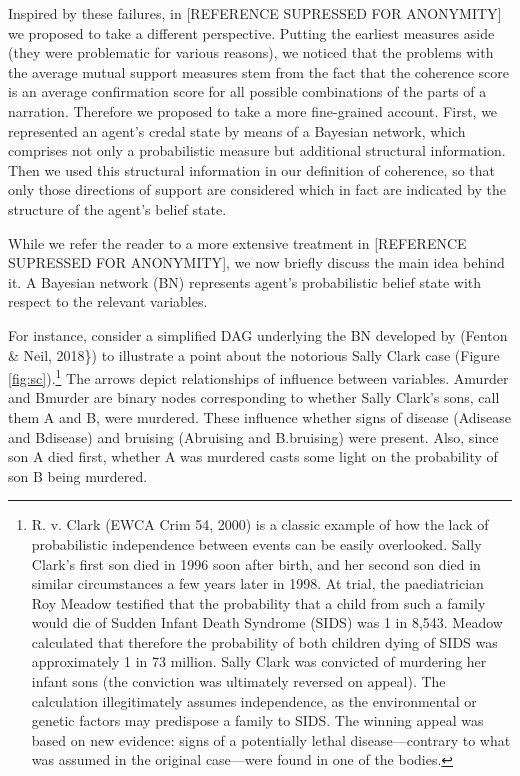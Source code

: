 \documentclass[
  10pt,
]{scrartcl}
\begin{document}
Inspired by these failures, in {[}REFERENCE SUPRESSED FOR ANONYMITY{]} we proposed to take a different perspective. Putting the earliest measures aside (they were problematic for various reasons), we noticed that the problems with the average mutual support measures stem from the fact that the coherence score is an average confirmation score for all possible combinations of the parts of a narration. Therefore we proposed to take a more fine-grained account. First, we represented an agent's credal state by means of a Bayesian network, which comprises not only a probabilistic measure but additional structural information. Then we used this structural information in our definition of coherence, so that only those directions of support are considered which in fact are indicated by the structure of the agent's belief state.

While we refer the reader to a more extensive treatment in {[}REFERENCE SUPRESSED FOR ANONYMITY{]}, we now briefly discuss the main idea behind it. A Bayesian network (BN) represents agent's probabilistic belief state with respect to the relevant variables.

For instance, consider a simplified DAG underlying the BN developed by (Fenton \& Neil, 2018\}) to illustrate a point about the notorious Sally Clark case (Figure \ref{fig:sc}).\footnote{ R. v. Clark (EWCA Crim 54, 2000) is a classic example of how the lack of probabilistic independence between events can be easily overlooked. Sally Clark's first son died in 1996 soon after birth, and her second son died in similar circumstances a few years later in 1998. At trial, the paediatrician Roy Meadow testified that the probability that a child from such a family would die of Sudden Infant Death Syndrome (SIDS) was 1 in 8,543. Meadow calculated that therefore the probability of both children dying of SIDS was approximately 1 in 73 million. Sally Clark was convicted of murdering her infant sons (the conviction was ultimately reversed on appeal). The calculation illegitimately assumes independence, as the environmental or genetic factors may predispose a family to SIDS. The winning appeal was based on new evidence: signs of a potentially lethal disease---contrary to what was assumed in the original case---were found in one of the bodies.} The arrows depict relationships of influence between variables. \textsf{Amurder} and \textsf{Bmurder} are binary nodes corresponding to whether Sally Clark's sons, call them A and B, were murdered. These influence whether signs of disease (\textsf{Adisease} and \textsf{Bdisease}) and bruising (\textsf{Abruising} and \textsf{B.bruising}) were present. Also, since son A died first, whether A was murdered casts some light on the probability of son B being murdered.
\end{document}
